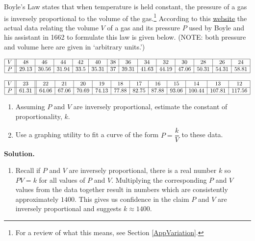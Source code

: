 \begin{ex}  \label{BoyleslawRational} Boyle's Law states that when temperature is held constant, the pressure of a gas is inversely proportional to the volume of the gas.\footnote{For a review of what this means, see Section \ref{AppVariation}.}  According to this \href{http://web.lemoyne.edu/~giunta/classicalcs/boyleverify.html}{\underline{website}} the actual data relating the volume $V$ of a gas and its pressure $P$ used by Boyle and his assistant in 1662 to formulate this law is given below. (NOTE: both pressure and volume here are given in `arbitrary units.')

\[ \begin{array}{|c||c|c|c|c|c|c|c|c|c|c|c|c|c|}  \hline

V & 48 & 46 & 44 & 42 & 40 & 38 & 36 & 34 & 32 & 30 & 28 & 26 & 24  \\ \hline

P & 29.13 & 30.56 & 31.94 & 33.5 & 35.31 & 37 & 39.31 & 41.63 & 44.19 & 47.06 & 50.31 & 54.31 & 58.81  \\ \hline \end{array} \]


\[\begin{array}{|c||c||c|c|c|c|c|c|c|c|c|c|c|c|} \hline

V & 23 & 22 & 21 & 20 & 19 & 18 & 17 & 16 & 15 & 14 & 13 & 12  \\ \hline 

P & 61.31 & 64.06 & 67.06 & 70.69 & 74.13 & 77.88 & 82.75 & 87.88 & 93.06 & 100.44 & 107.81 & 117.56   \\ \hline \end{array} \]

\begin{enumerate}

\item Assuming  $P$ and $V$ are inversely proportional, estimate  the constant of proportionality, $k$.

\item Use a graphing utility to fit a curve of the form $P = \dfrac{k}{V}$ to these data.  

\end{enumerate}
 
{\bf Solution.}

\begin{enumerate}

\item Recall if $P$ and $V$ are inversely proportional, there is a real number $k$ so $PV = k$ for all values of $P$ and $V$.  Multiplying the corresponding $P$ and $V$ values from the data together result in numbers which are consistently approximately $1400$.  This gives us confidence in the claim $P$ and $V$ are inversely proportional and suggests $k \approx 1400$.


\end{enumerate}
\end{ex}
